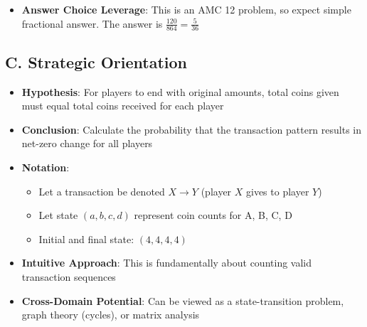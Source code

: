 \documentclass[]{article}
\begin{document}
\begin{problemconfigbox}
\begin{itemize}[leftmargin=*]
    \item \textbf{Answer Choice Leverage}: This is an AMC 12 problem, so expect simple fractional answer. The answer is $\boxed{\frac{120}{864} = \frac{5}{36}}$
\end{itemize}

\subsection*{C. Strategic Orientation}
\begin{itemize}[leftmargin=*]
    \item \textbf{Hypothesis}: For players to end with original amounts, total coins given must equal total coins received for each player
    \item \textbf{Conclusion}: Calculate the probability that the transaction pattern results in net-zero change for all players
    \item \textbf{Notation}:
    \begin{itemize}
        \item Let a transaction be denoted $X \to Y$ (player $X$ gives to player $Y$)
        \item Let state $(a,b,c,d)$ represent coin counts for A, B, C, D
        \item Initial and final state: $(4,4,4,4)$
    \end{itemize}
    \item \textbf{Intuitive Approach}: This is fundamentally about counting valid transaction sequences
    \item \textbf{Cross-Domain Potential}: Can be viewed as a state-transition problem, graph theory (cycles), or matrix analysis
\end{itemize}
\end{problemconfigbox}
\end{document}
